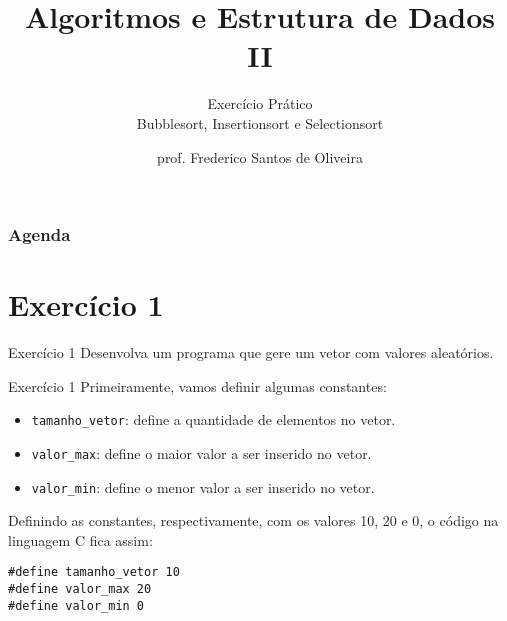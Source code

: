 \documentclass[aspectratio=169]{beamer}
\title[Algoritmos de Ordenação]{Algoritmos e Estrutura de Dados II}
\subtitle{Exercício Prático\\Bubblesort, Insertionsort e Selectionsort}
\author[Frederico Santos de Oliveira]{prof. Frederico Santos de Oliveira}
\institute[UFMT]{Universidade Federal de Mato Grosso\\ Instituto de Engenharia}
\date{}
\begin{document}

\begin{frame}[plain]
  \titlepage
\end{frame}


\begin{frame}
  \frametitle{Agenda}
  \tableofcontents
\end{frame}

\section{Exercício 1}

\begin{frame}{Exercício 1}
Desenvolva um programa que gere um vetor com valores aleatórios.
\end{frame}


\begin{frame}[fragile]{Exercício 1}
Primeiramente, vamos definir algumas constantes: 
\begin{itemize}
\item \verb|tamanho_vetor|: define a quantidade de elementos no vetor.
\item \verb|valor_max|: define o maior valor a ser inserido no vetor.
\item \verb|valor_min|: define o menor valor a ser inserido no vetor.
\end{itemize}
Definindo as constantes, respectivamente, com os valores 10, 20 e 0, o código na linguagem C fica assim:

\begin{lstlisting}[style=CStyle]
#define tamanho_vetor 10
#define valor_max 20
#define valor_min 0
\end{lstlisting}     
\end{frame}
\end{document}

